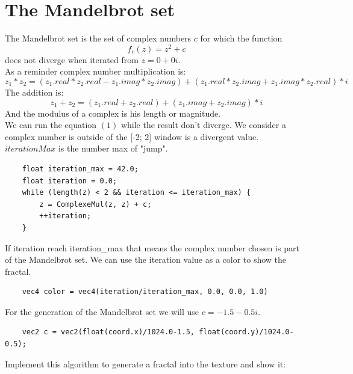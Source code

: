 \documentclass{article}
\begin{document}
\section{The Mandelbrot set}
The Mandelbrot set is the set of complex numbers $c$ for which the function
\begin{equation}
f_c(z) = z^2+c
\end{equation}
does not diverge when iterated from $z = 0+0i$.\\
As a reminder complex number multiplication is:
\begin{equation}
z_1*z_2 = (z_1.real*z_2.real-z_1.imag*z_2.imag) + (z_1.real*z_2.imag + z_1.imag*z_2.real)*i
\end{equation}
The addition is:
\begin{equation}
z_1 + z_2 = (z_1.real + z_2.real) + (z_1.imag + z_2.imag)*i
\end{equation}
And the modulus of a complex is his length or magnitude.\\
We can run the equation $(1)$ while the result don't diverge. We consider a complex number is outside of the [-2; 2] window is a divergent value. $iterationMax$ is the number max of "jump".
\begin{lstlisting}
	float iteration_max = 42.0;
	float iteration = 0.0;
	while (length(z) < 2 && iteration <= iteration_max) {
		z = ComplexeMul(z, z) + c;
		++iteration;
	}
\end{lstlisting}
If iteration reach iteration\_max that means the complex number chosen is part of the Mandelbrot set. We can use the iteration value as a color to show the fractal.
\begin{lstlisting}
	vec4 color = vec4(iteration/iteration_max, 0.0, 0.0, 1.0)
\end{lstlisting}
For the generation of the Mandelbrot set we will use $c = -1.5 - 0.5i$.
\begin{lstlisting}
	vec2 c = vec2(float(coord.x)/1024.0-1.5, float(coord.y)/1024.0-0.5);
\end{lstlisting}
Implement this algorithm to generate a fractal into the texture and show it:
\end{document}
